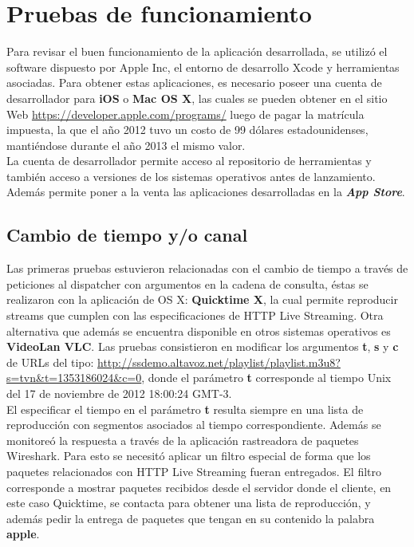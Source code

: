 
\chapter{Pruebas de funcionamiento}

Para revisar el buen funcionamiento de la aplicación desarrollada, se utilizó el software dispuesto por Apple Inc,  el entorno de desarrollo Xcode y herramientas asociadas. Para obtener estas aplicaciones, es necesario poseer una cuenta de desarrollador para \textbf{iOS} o \textbf{Mac OS X}, las cuales se pueden obtener en el sitio Web \url{https://developer.apple.com/programs/} luego de pagar la matrícula impuesta, la que el año 2012 tuvo un costo de 99 dólares estadounidenses, mantiéndose durante el año 2013 el mismo valor.\\

La cuenta de desarrollador permite acceso al repositorio de herramientas \cite{apple-repositorio} y también acceso a versiones de los sistemas operativos antes de lanzamiento.
Además permite poner a la venta las aplicaciones desarrolladas en la \textit{\textbf{App Store}}\cite{apple-appstore}.

\section{Cambio de tiempo y/o canal}

Las primeras pruebas estuvieron relacionadas con el cambio de tiempo a través de peticiones al dispatcher con argumentos en la cadena de consulta, éstas se realizaron con la aplicación de OS X: \textbf{Quicktime X}, la cual permite reproducir streams que cumplen con las especificaciones de HTTP Live Streaming. Otra alternativa que además se encuentra disponible en otros sistemas operativos es \textbf{VideoLan VLC}. Las pruebas consistieron en modificar los argumentos \textbf{t}, \textbf{s} y \textbf{c} de URLs del tipo:
\url{http://ssdemo.altavoz.net/playlist/playlist.m3u8?s=tvn&t=1353186024&c=0}, donde el parámetro \textbf{t} corresponde al tiempo Unix del 17 de noviembre de 2012 18:00:24 GMT-3.\\

El especificar el tiempo en el parámetro \textbf{t} resulta siempre en una lista de reproducción con segmentos asociados al tiempo correspondiente. Además se monitoreó la respuesta a través de la aplicación rastreadora de paquetes Wireshark. Para esto se necesitó aplicar un filtro especial de forma que los paquetes relacionados con HTTP Live Streaming fueran entregados. El filtro corresponde a mostrar paquetes recibidos desde el servidor donde el cliente, en este caso Quicktime, se contacta para obtener una lista de reproducción, y además pedir la entrega de paquetes que tengan en su contenido la palabra \textbf{apple}.

